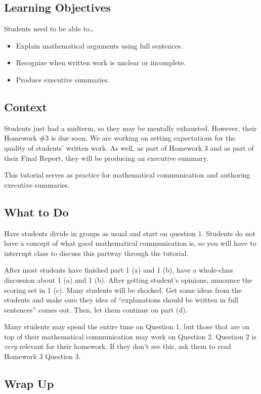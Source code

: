 \subsection*{Learning Objectives}
Students need to be able to\ldots
\begin{itemize}
	\item Explain mathematical arguments using full sentences.
	\item Recognize when written work is unclear or incomplete.
	\item Produce executive summaries.
\end{itemize}

\subsection*{Context}
Students just had a midterm, so they may be mentally exhausted. However, their Homework \#3 is
due soon. We are working on setting expectations for the quality of students' written work. As well,
as part of Homework 3 and as part of their Final Report, they will be producing an executive summary.

This tutorial serves as practice for mathematical communication and authoring executive summaries.

\subsection*{What to Do}

Have students divide in groups as usual and start on question 1. Students do not have a concept of
what good mathematical communication is, so you will have to interrupt class to discuss this partway through the tutorial.

After most students have finished part 1 (a) and 1 (b), have a whole-class discussion about 1 (a) and 1 (b).
After getting student's opinions, announce the scoring set in 1 (c). Many students will be shocked. Get some ideas
from the students and make sure they idea of ``explanations should be written in full sentences'' comes out. Then,
let them continue on part (d).

Many students may spend the entire time on Question 1, but those that are on top of their mathematical communication
may work on Question 2. Question 2 is \emph{very} relevant for their homework. If they don't see this, ask them to read Homework 3 Question 3.

\subsection*{Wrap Up}

